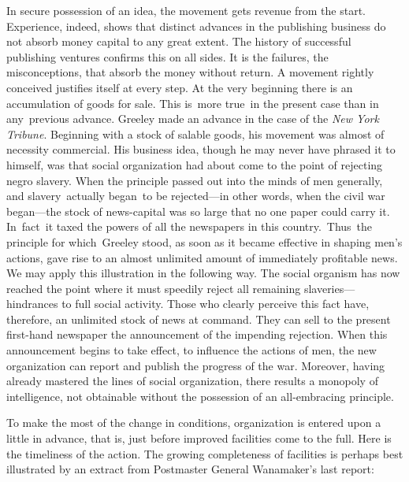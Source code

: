 \documentclass[twoside,symmetric,nobib,justified]{tufte-book}
\begin{document}
In secure possession of an idea, the movement gets revenue from the
start. Experience, indeed, shows that distinct advances in the
publishing business do not absorb money capital to any great extent. The
history of successful publishing ventures confirms this on all sides. It
is the failures, the misconceptions, that absorb the money without
return. A movement rightly conceived justifies itself at every step. At
the very beginning there is an accumulation of goods for sale. This
is~more true~in the present case than in any~previous advance. Greeley
made an advance in the case of the \emph{New York Tribune}. Beginning
with a stock of salable goods, his movement was almost of necessity
commercial. His business idea, though he may never have phrased it to
himself, was that social organization had about come to the point of
rejecting negro slavery. When the principle passed out into the minds of
men generally, and slavery~actually began~to be rejected---in other
words, when the civil war began---the stock of news-capital was so large
that no one paper could carry it. In~fact~it taxed the powers of all the
newspapers in this country.~Thus~the principle for which~Greeley stood,
as soon as it became effective in shaping men's actions, gave rise to an
almost unlimited amount of immediately profitable news. We may apply
this illustration in the following way. The social organism has now
reached the point where it must speedily reject all remaining
slaveries---hindrances to full social activity. Those who clearly
perceive this fact have, therefore, an unlimited stock of news at
command. They can sell to the present first-hand newspaper the
announcement of the impending rejection. When this announcement begins
to take effect, to influence the actions of men, the new organization
can report and publish the progress of the war. Moreover, having already
mastered the lines of social organization, there results a monopoly of
intelligence, not obtainable without the possession of an all-embracing
principle.~

To make the most of the change in conditions, organization is entered
upon a little in advance, that is, just before improved facilities come
to the full. Here is the timeliness of the action. The growing
completeness of facilities is perhaps best illustrated by an extract
from Postmaster General Wanamaker's last report:
\end{document}
